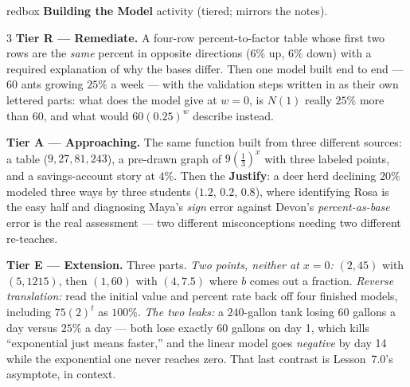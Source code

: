 \documentclass[10pt]{article}
\begin{document}
\begin{skillbox}{redbox}
\textbf{Building the Model} activity (tiered; mirrors the notes).
\begin{multicols}{3}
\textbf{Tier R --- Remediate.} A four-row percent-to-factor table whose first two rows are the
\emph{same} percent in opposite directions ($6\%$ up, $6\%$ down) with a required explanation of why
the bases differ. Then one model built end to end --- $60$ ants growing $25\%$ a week --- with the
validation steps written in as their own lettered parts: what does the model give at $w=0$, is
$N(1)$ really $25\%$ more than $60$, and what would $60(0.25)^{w}$ describe instead.

\columnbreak
\textbf{Tier A --- Approaching.} The same function built from three different sources: a table
($9,27,81,243$), a pre-drawn graph of $9\left(\frac13\right)^{x}$ with three labeled points, and a
savings-account story at $4\%$. Then the \textbf{Justify}: a deer herd declining $20\%$ modeled three
ways by three students ($1.2$, $0.2$, $0.8$), where identifying Rosa is the easy half and diagnosing
Maya's \emph{sign} error against Devon's \emph{percent-as-base} error is the real assessment ---
two different misconceptions needing two different re-teaches.

\columnbreak
\textbf{Tier E --- Extension.} Three parts. \emph{Two points, neither at $x=0$:} $(2,45)$ with
$(5,1215)$, then $(1,60)$ with $(4,7.5)$ where $b$ comes out a fraction. \emph{Reverse translation:}
read the initial value and percent rate back off four finished models, including $75(2)^{t}$ as
$100\%$. \emph{The two leaks:} a $240$-gallon tank losing $60$ gallons a day versus $25\%$ a day ---
both lose exactly $60$ gallons on day 1, which kills ``exponential just means faster,'' and the
linear model goes \emph{negative} by day 14 while the exponential one never reaches zero. That last
contrast is Lesson~7.0's asymptote, in context.
\end{multicols}
\end{skillbox}
\end{document}
